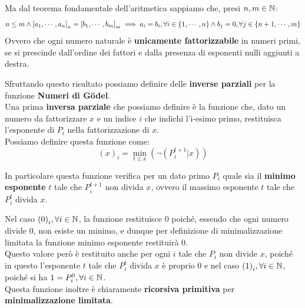 Ma dal teorema fondamentale dell'aritmetica sappiamo che, presi \(n,m\in\mathbb{N}\):
\begin{equation}
  n\leq m \land {[a_1,\cdots,a_n]}_n={[b_1,\cdots,b_m]}_m \implies a_i=b_i, \forall i \in \displaystyle{\left\{{1,\cdots,n}\right\}} \land b_j=0, \forall j \in \displaystyle{\left\{{n+1,\cdots,m}\right\}}
\end{equation}
Ovvero che ogni numero naturale è \textbf{unicamente fattorizzabile} in numeri primi, se si prescinde dall'ordine dei fattori e dalla presenza di esponenti nulli aggiunti a destra.

Sfruttando questo risultato possiamo definire delle \textbf{inverse parziali} per la funzione \textbf{Numeri di Gödel}.\\
Una prima \textbf{inversa parziale} che possiamo definire è la funzione che, dato un numero da fattorizzare \(x\) e un indice \(i\) che indichi l'i-esimo primo, restituisca l'esponente di \(P_i\) nella fattorizzazione di \(x\).\\
Possiamo definire questa funzione come:
\begin{equation}
  {(x)}_i=\min_{t\leq x}(\neg(P_i^{t+1}\vert x))
\end{equation}

In particolare questa funzione verifica per un dato primo \(P_i\) quale sia il \textbf{minimo esponente} \(t\) tale che \(P_i^{t+1}\) non divida \(x\), ovvero il massimo esponente \(t\) tale che \(P_i^{t}\) divida \(x\).

Nel caso \({(0)}_i, \forall i \in \mathbb{N}\), la funzione restituisce \(0\) poiché, essendo che ogni numero divide \(0\), non esiste un minimo, e dunque per definizione di minimalizzazione limitata la funzione minimo esponente restituirà \(0\).\\
Questo valore però è restituito anche per ogni \(i\) tale che \(P_i\) non divide \(x\), poiché in questo l'esponente \(t\) tale che \(P_i^{t}\) divida \(x\) è proprio \(0\) e nel caso \({(1)}_i, \forall i \in \mathbb{N}\), poiché si ha \(1=P_i^0, \forall i \in \mathbb{N}\).\\
Questa funzione inoltre è chiaramente \textbf{ricorsiva primitiva} per \textbf{minimalizzazione limitata}.


